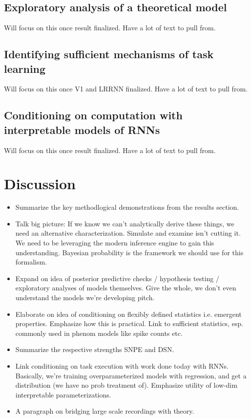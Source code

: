 \documentclass[11pt]{article}
\begin{document}
\subsection{Exploratory analysis of a theoretical model}
Will focus on this once result finalized.  Have a lot of text to pull from.

\subsection{Identifying sufficient mechanisms of task learning}
Will focus on this once V1 and LRRNN finalized.  Have a lot of text to pull from.

\subsection{Conditioning on computation with interpretable models of RNNs}
Will focus on this once result finalized.  Have a lot of text to pull from.

\section{Discussion}
\begin{itemize}
\item Summarize the key methodlogical demonstrations from the results section.
\item Talk big picture: If we know we can't analytically derive these things, we need an alternative characterization.  Simulate and examine isn't cutting it.  We need to be leveraging the modern inference engine to gain this understanding.  Bayesian probability is the framework we should use for this formalism.
\item Expand on idea of posterior predictive checks / hypothesis testing / exploratory analyses of models themselves.  Give the whole, we don't even understand the models we're developing pitch.
\item Elaborate on idea of conditioning on flexibly defined statistics i.e. emergent properties. Emphasize how this is practical.  Link to sufficient statistics, esp. commonly used in phenom models like spike counts etc.
\item Summarize the respective strengths SNPE and DSN.
\item Link conditioning on task execution with work done today with RNNs.  Basically, we're training overparameterized models with regression, and get a distribution (we have no prob treatment of). Emphasize utility of low-dim interpretable parameterizations.
\item A paragraph on bridging large scale recordings with theory.
\end{itemize}
\end{document}

